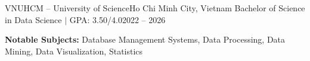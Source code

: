 \resumeSubHeadingListStart
  \resumeSubheading
    {VNUHCM -- University of Science}{Ho Chi Minh City, Vietnam}
    {Bachelor of Science in Data Science $|$ GPA: 3.50/4.0}{2022 -- 2026}
    \vspace{2pt}
    \item[] \small{\textbf{Notable Subjects:} Database Management Systems, Data Processing, Data Mining, Data Visualization, Statistics}
\resumeSubHeadingListEnd
